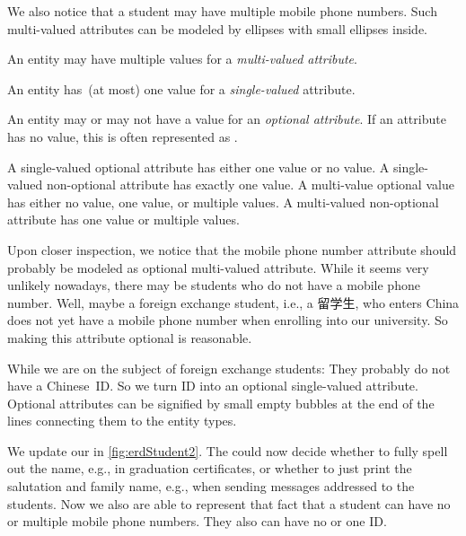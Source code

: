 We also notice that a student may have multiple mobile phone numbers.
Such multi-valued attributes can be modeled by ellipses with small ellipses inside.%
%
\begin{definition}%
An entity may have multiple values for a \emph{multi-valued attribute}.%
\end{definition}%
\begin{definition}%
An entity has~(at most) one value for a \emph{single-valued} attribute.%
\end{definition}%
\begin{definition}%
An entity may or may not have a value for an \emph{optional attribute}. %
If an attribute has no value, this is often represented as .%
\end{definition}%
%
A single-valued optional attribute has either one value or no value.
A single-valued non-optional attribute has exactly one value.
A multi-value optional value has either no value, one value, or multiple values.
A multi-valued non-optional attribute has one value or multiple values.

Upon closer inspection, we notice that the mobile phone number attribute should probably be modeled as optional multi-valued attribute.
While it seems very unlikely nowadays, there may be students who do not have a mobile phone number.
Well, maybe a foreign exchange student, i.e., a 留学生, who enters China does not yet have a mobile phone number when enrolling into our university.
So making this attribute optional is reasonable.

While we are on the subject of foreign exchange students:
They probably do not have a Chinese~ID.
So we turn ID into an optional single-valued attribute.
Optional attributes can be signified by small empty bubbles at the end of the lines connecting them to the entity types.

We update our  in \cref{fig:erdStudent2}.
The  could now decide whether to fully spell out the name, e.g., in graduation certificates, or whether to just print the salutation and family name, e.g., when sending messages addressed to the students.
Now we also are able to represent that fact that a student can have no or multiple mobile phone numbers.
They also can have no or one ID.

